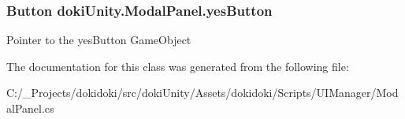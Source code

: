 \subsubsection[{\texorpdfstring{yes\+Button}{yesButton}}]{\setlength{\rightskip}{0pt plus 5cm}Button doki\+Unity.\+Modal\+Panel.\+yes\+Button}\hypertarget{classdoki_unity_1_1_modal_panel_a72113e073c692caa38601f17c6ffde6c}{}\label{classdoki_unity_1_1_modal_panel_a72113e073c692caa38601f17c6ffde6c}


Pointer to the yes\+Button Game\+Object 



The documentation for this class was generated from the following file\+:\begin{DoxyCompactItemize}
\item 
C\+:/\+\_\+\+Projects/dokidoki/src/doki\+Unity/\+Assets/dokidoki/\+Scripts/\+U\+I\+Manager/Modal\+Panel.\+cs\end{DoxyCompactItemize}
